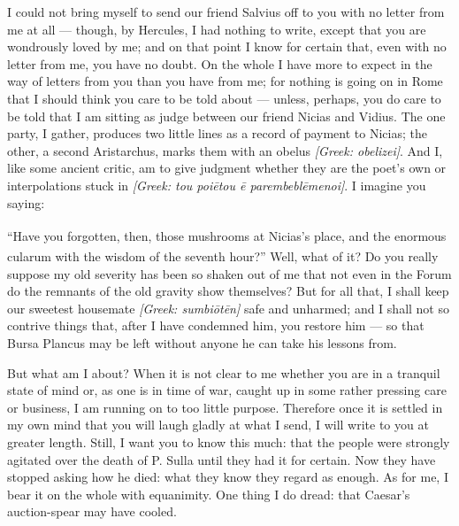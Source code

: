 

 I could not bring myself to send our friend Salvius off to you with no letter from me at all --- though, by Hercules, I had nothing to write, except that you are wondrously loved by me; and on that point I know for certain that, even with no letter from me, you have no doubt. On the whole I have more to expect in the way of letters from you than you have from me; for nothing is going on in Rome that I should think you care to be told about --- unless, perhaps, you do care to be told that I am sitting as judge between our friend Nicias and Vidius. The one party, I gather, produces two little lines as a record of payment to Nicias; the other, a second Aristarchus, marks them with an obelus \textit{[Greek: obelizei]}. And I, like some ancient critic, am to give judgment whether they are the poet's own or interpolations stuck in \textit{[Greek: tou poiētou ē parembeblēmenoi]}. I imagine you saying:

 ``Have you forgotten, then, those mushrooms at Nicias's place, and the enormous \textsuperscript{\textdagger}cularum\textsuperscript{\textdagger} with the wisdom of the seventh hour?'' Well, what of it? Do you really suppose my old severity has been so shaken out of me that not even in the Forum do the remnants of the old gravity show themselves? But for all that, I shall keep our sweetest housemate \textit{[Greek: sumbiōtēn]} safe and unharmed; and I shall not so contrive things that, after I have condemned him, you restore him --- so that Bursa Plancus may be left without anyone he can take his lessons from.

 But what am I about? When it is not clear to me whether you are in a tranquil state of mind or, as one is in time of war, caught up in some rather pressing care or business, I am running on to too little purpose. Therefore once it is settled in my own mind that you will laugh gladly at what I send, I will write to you at greater length. Still, I want you to know this much: that the people were strongly agitated over the death of P. Sulla until they had it for certain. Now they have stopped asking how he died: what they know they regard as enough. As for me, I bear it on the whole with equanimity. One thing I do dread: that Caesar's auction-spear may have cooled.

